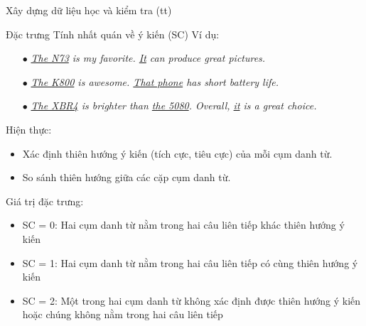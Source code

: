 \documentclass[9pt,xcolor=table,hyperref=unicode]{beamer}
\begin{document}
	\begin{frame}{Xây dựng dữ liệu học và kiểm tra (tt)}
		\begin{block}{Đặc trưng Tính nhất quán về ý kiến (SC)}		
			Ví dụ:\\
			\begin{itemize}				
				\item[$\bullet$]{\textit{\underline{The N73} is my favorite. \underline{It} can produce great pictures.}}
				\item[$\bullet$]{\textit{\underline{The K800} is awesome. \underline{That phone} has short battery life.}}
				\item[$\bullet$]{\textit{\underline{The XBR4} is brighter than \underline{the 5080}. Overall, \underline{it} is a great choice.}}
			\end{itemize}
			Hiện thực: \\
				\begin{itemize}
					\item{Xác định thiên hướng ý kiến (tích cực, tiêu cực) của mỗi cụm danh từ.}
					\item{So sánh thiên hướng giữa các cặp cụm danh từ.}
				\end{itemize}
			Giá trị đặc trưng: \\
			\begin{itemize}
				\item{SC = 0: Hai cụm danh từ nằm trong hai câu liên tiếp khác thiên hướng ý kiến}
				\item{SC = 1: Hai cụm danh từ nằm trong hai câu liên tiếp có cùng thiên hướng ý kiến}
				\item{SC = 2: Một trong hai cụm danh từ không xác định được thiên hướng ý kiến hoặc chúng không nằm trong hai câu liên tiếp}
			\end{itemize}									
		\end{block}	
				
	\end{frame}	

	
\end{document}
